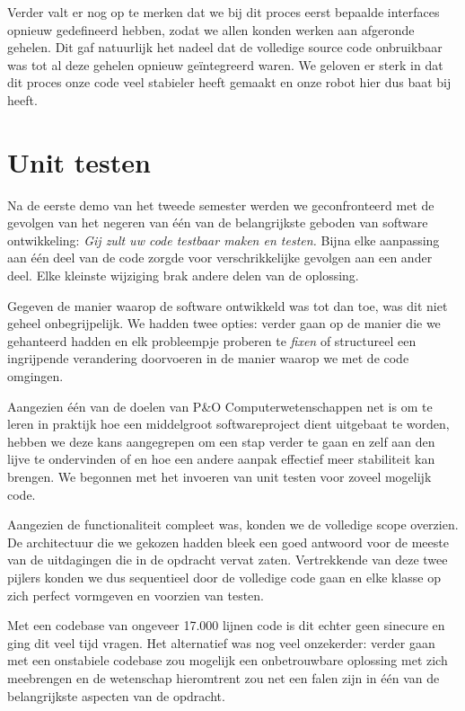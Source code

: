 \documentclass[12pt,a4paper]{report}
\begin{document}
Verder valt er nog op te merken dat we bij dit proces eerst bepaalde interfaces opnieuw gedefineerd hebben, zodat we allen konden werken aan afgeronde gehelen. Dit gaf natuurlijk het nadeel dat de volledige source code onbruikbaar was tot al deze gehelen opnieuw ge\"integreerd waren. We geloven er sterk in dat dit proces onze code veel stabieler heeft gemaakt en onze robot hier dus baat bij heeft.

\section{Unit testen}
\label{unittesten}

Na de eerste demo van het tweede semester werden we geconfronteerd met de gevolgen van het negeren van \'e\'en van de belangrijkste geboden van software ontwikkeling: \emph{Gij zult uw code testbaar maken en testen.} Bijna elke aanpassing aan \'e\'en deel van de code zorgde voor verschrikkelijke gevolgen aan een ander deel. Elke kleinste wijziging brak andere delen van de oplossing.

Gegeven de manier waarop de software ontwikkeld was tot dan toe, was dit niet geheel onbegrijpelijk. We hadden twee opties: verder gaan op de manier die we gehanteerd hadden en elk probleempje proberen te \emph{fixen} of structureel een ingrijpende verandering doorvoeren in de manier waarop we met de code omgingen.

Aangezien \'e\'en van de doelen van P\&O Computerwetenschappen net is om te leren in praktijk hoe een middelgroot softwareproject dient uitgebaat te worden, hebben we deze kans aangegrepen om een stap verder te gaan en zelf aan den lijve te ondervinden of en hoe een andere aanpak effectief meer stabiliteit kan brengen. We begonnen met het invoeren van unit testen voor zoveel mogelijk code.

Aangezien de functionaliteit compleet was, konden we de volledige scope overzien. De architectuur die we gekozen hadden bleek een goed antwoord voor de meeste van de uitdagingen die in de opdracht vervat zaten. Vertrekkende van deze twee pijlers konden we dus sequentieel door de volledige code gaan en elke klasse op zich perfect vormgeven en voorzien van testen.

Met een codebase van ongeveer 17.000 lijnen code is dit echter geen sinecure en ging dit veel tijd vragen. Het alternatief was nog veel onzekerder: verder gaan met een onstabiele codebase zou mogelijk een onbetrouwbare oplossing met zich meebrengen en de wetenschap hieromtrent zou net een falen zijn in \'e\'en van de belangrijkste aspecten van de opdracht.
\end{document}
